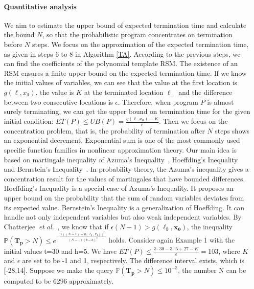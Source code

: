 \documentclass[sigconf,review, anonymous]{acmart}
\begin{document}
\paragraph{Quantitative analysis} We aim to estimate the upper bound of expected termination time and calculate the bound $N$, so that the probabilistic program concentrates on termination before $N$ steps. 
We focus on the approximation of the expected termination time, as given in steps 6 to 8 in Algorithm \ref{TA}. According to the previous steps, we can find the coefficients of the polynomial template RSM. The existence of an RSM ensures a finite upper bound on the expected termination time. If we know the initial values of variables, we can see that the value at the first location is $g(\ell, x_0)$, the value is $K$ at the terminated location $\ell_\bot$ and the difference between two consecutive locations is $\epsilon$.  Therefore, when program $P$ is almost surely terminating, we can get the upper bound on termination time for the given initial condition: $ET(P) \leq UB(P) = \frac{g(\ell, x_0)-K}{\epsilon}$. 
Then we focus on the concentration problem, that is, the probability of termination after $N$ steps shows an exponential decrement. Exponential sum is one of the most commonly used specific function families in nonlinear approximation theory. Our main idea is based on martingale inequality of Azuma's Inequality~\cite{Azuma1967}, Hoeffding's Inequality~\cite{Hoeffding1963,McDiarmid1998Concentration}  and Bernstein's Inequality~\cite{Bennett1962,McDiarmid1998Concentration}. In probability theory, the Azuma's inequality gives a concentration result for the values of martingales that have bounded differences. Hoeffding's Inequality is a special case of Azuma's Inequality. It proposes an upper bound on the probability that the sum of random variables deviates from its expected value. Bernstein's Inequality is a generalization of Hoeffding. It can handle not only independent variables but also weak independent variables. By Chatterjee~\emph{et al.}~\cite{cha2015algorithmic}, we know that if $\epsilon(N-1) > g(\ell_0,\boldsymbol{x_0})$, the inequality $\mathbb{P}(\bm{T_p} > N)\leq e^{-\frac{2((N-1)-g(\ell_0,x_0))^2}{(N-1)(b-a)^2}}$ holds. 
Consider again Example 1 with the initial values t=30 and h=5. We have  $ET(P) \leq \frac{3\cdot 30-3\cdot 5+27-K}{\epsilon}=103$, where $K$ and $\epsilon$ are set to be -1 and 1, respectively. The difference interval exists, which is [-28,14]. Suppose we make the query $\mathbb{P}(\bm{T_p} > N)\leq 10^{-3}$, the number N can be computed to be 6296  approximately.
\end{document}
